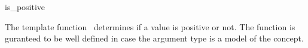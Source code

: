 \begin{ccRefFunction}{is_positive}

\ccDefinition

The template function \ccRefName\ determines if a value is positive or not.
The function is guranteed to be well defined in case the argument type 
is a model of the  concept. 


{}

\ccSeeAlso
{} \\
\\

\end{ccRefFunction}
